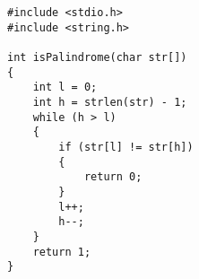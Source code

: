 
\begin{lstlisting}[style=CStyle, caption=Function isPalindrome., label=isPalindrome]
#include <stdio.h> 
#include <string.h> 

int isPalindrome(char str[]) 
{ 
    int l = 0; 
    int h = strlen(str) - 1; 
    while (h > l) 
    { 
        if (str[l] != str[h]) 
        { 
            return 0;
        } 
        l++;
        h--;
    } 
    return 1; 
} 
\end{lstlisting}